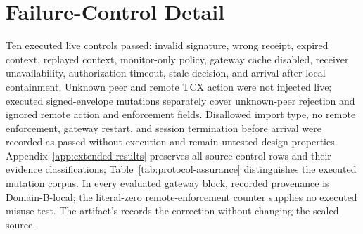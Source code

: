 \section{Failure-Control Detail}

Ten executed live controls passed: invalid signature, wrong receipt, expired context, replayed context, monitor-only policy, gateway cache disabled, receiver unavailability, authorization timeout, stale decision, and arrival after local containment. Unknown peer and remote TCX action were not injected live; executed signed-envelope mutations separately cover unknown-peer rejection and ignored remote action and enforcement fields. Disallowed import type, no remote enforcement, gateway restart, and session termination before arrival were recorded as passed without execution and remain untested design properties. Appendix~\ref{app:extended-results} preserves all source-control rows and their evidence classifications; Table~\ref{tab:protocol-assurance} distinguishes the executed mutation corpus. In every evaluated gateway block, recorded provenance is Domain-B-local; the literal-zero remote-enforcement counter supplies no executed misuse test. The artifact's  records the correction without changing the sealed source.
